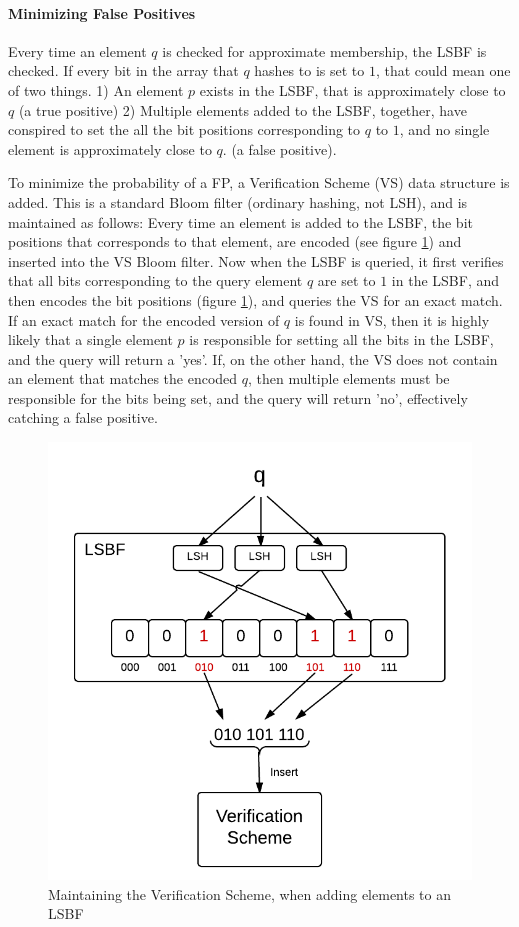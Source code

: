 \documentclass[a4paper,11pt]{article}
\begin{document}
\paragraph{Minimizing False Positives}
Every time an element $q$ is checked for approximate membership, the LSBF is checked. If every bit in the array that $q$ hashes to is set to $1$, that could mean one of two things.
1) An element $p$ exists in the LSBF, that is approximately close to $q$ (a true positive)
2) Multiple elements added to the LSBF, together, have conspired to set the all the bit positions corresponding to $q$ to $1$, and no single element is approximately close to $q$. (a false positive).

To minimize the probability of a FP, a Verification Scheme (VS) data structure is added.
This is a standard Bloom filter (ordinary hashing, not LSH), and is maintained as follows: Every time an element is added to the LSBF, the bit positions that corresponds to that element, are encoded (see figure \ref{fig:verification_scheme}) and inserted into the VS Bloom filter. 
Now when the LSBF is queried, it first verifies that all bits corresponding to the query element $q$ are set to $1$ in the LSBF, and then encodes the bit positions (figure \ref{fig:verification_scheme}), and queries the VS for an exact match. If an exact match for the encoded version of $q$ is found in VS, then it is highly likely that a single element $p$ is responsible for setting all the bits in the LSBF, and the query will return a 'yes'. If, on the other hand, the VS does not contain an element that matches the encoded $q$, then multiple elements must be responsible for the bits being set, and the query will return 'no', effectively catching a false positive. 

\begin{figure}[H]
\centering
\includegraphics[width=.5\linewidth]{verification_scheme}
\caption{Maintaining the Verification Scheme, when adding elements to an LSBF}
\label{fig:verification_scheme}
\end{figure}
\end{document}
